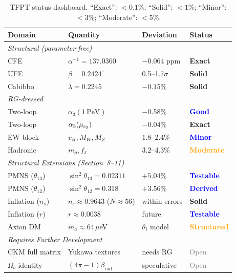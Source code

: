 \begin{table}[H]
\centering
\renewcommand{\arraystretch}{1.3}
\begin{tabular}{@{}p{3cm}p{4cm}p{3cm}l@{}}
\toprule
\textbf{Domain} & \textbf{Quantity} & \textbf{Deviation} & \textbf{Status}\\
\midrule
\multicolumn{4}{l}{\textit{Structural (parameter-free)}}\\
\quad CFE & $\alpha^{-1} = 137.0360$ & $-0.064$ ppm & \textcolor{green!60!black}{\textbf{Exact}}\\
\quad UFE & $\beta = 0.2424^\circ$ & 0.5--1.7$\sigma$ & \textcolor{green!60!black}{\textbf{Solid}}\\
\quad Cabibbo & $\lambda = 0.2245$ & $-0.15\%$ & \textcolor{green!60!black}{\textbf{Solid}}\\
\midrule
\multicolumn{4}{l}{\textit{RG-dressed}}\\
\quad Two-loop & $\alpha_3(1\,\text{PeV})$ & $-0.58\%$ & \textcolor{blue}{\textbf{Good}}\\
\quad Two-loop & $\alpha_3(\mu_{c_3})$ & $-0.04\%$ & \textcolor{green!60!black}{\textbf{Exact}}\\
\quad EW block & $v_H, M_W, M_Z$ & 1.8--2.4\% & \textcolor{blue}{\textbf{Minor}}\\
\quad Hadronic & $m_p, f_\pi$ & 3.2--4.3\% & \textcolor{orange}{\textbf{Moderate}}\\
\midrule
\multicolumn{4}{l}{\textit{Structural Extensions (Section~8--11)}}\\
\quad PMNS ($\theta_{13}$) & $\sin^2\theta_{13} = 0.02311$ & $+5.04\%$ & \textcolor{blue}{\textbf{Testable}}\\
\quad PMNS ($\theta_{12}$) & $\sin^2\theta_{12} = 0.318$ & $+3.56\%$ & \textcolor{blue}{\textbf{Derived}}\\
\quad Inflation ($n_s$) & $n_s \approx 0.9643$ ($N\approx 56$) & within errors & \textcolor{green!60!black}{\textbf{Solid}}\\
\quad Inflation ($r$) & $r \approx 0.0038$ & future & \textcolor{blue}{\textbf{Testable}}\\
\quad Axion DM & $m_a \approx 64\,\mu$eV & $\theta_i$ model & \textcolor{orange}{\textbf{Structured}}\\
\midrule
\multicolumn{4}{l}{\textit{Requires Further Development}}\\
\quad CKM full matrix & Yukawa textures & needs RG & \textcolor{gray}{Open}\\
\quad $\Omega_b$ identity & $(4\pi-1)\beta_{\text{rad}}$ & speculative & \textcolor{gray}{Open}\\
\bottomrule
\end{tabular}
\caption{TFPT status dashboard. ``Exact'': $<0.1\%$; ``Solid'': $<1\%$; 
``Minor'': $<3\%$; ``Moderate'': $<5\%$.}
\label{tab:status}
\end{table}

